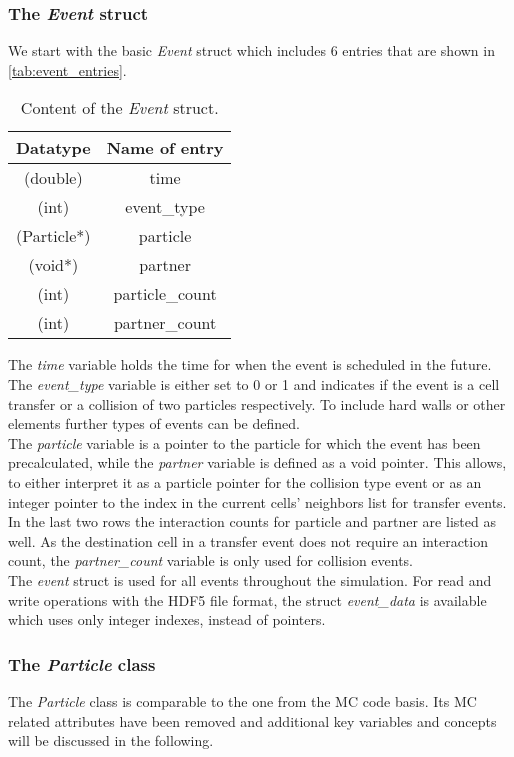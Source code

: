 \subsubsection{The \textit{Event} struct}
\label{sec:event_struct}
We start with the basic \textit{Event} struct which includes 6 entries that are shown in \autoref{tab:event_entries}.
\begin{table}[h!]
\centering
\begin{tabular}{c|c}
\textbf{Datatype} & \textbf{Name of entry}\\ \hline
(double) & time \\
(int) & event\_type \\
(Particle*)  & particle \\
(void*) & partner \\
(int) & particle\_count \\
(int) & partner\_count \\
\end{tabular}
\caption[Event struct content]{Content of the \textit{Event} struct.}
\label{tab:event_entries}
\end{table}
The \textit{time} variable holds the time for when the event is scheduled in the future. The \textit{event\_type} variable is either set to 0 or 1 and indicates if the event is a cell transfer or a collision of two particles respectively. To include hard walls or other elements further types of events can be defined.\\
The \textit{particle} variable is a pointer to the particle for which the event has been precalculated, while the \textit{partner} variable is defined as a void pointer. This allows, to either interpret it as a particle pointer for the collision type event or as an integer pointer to the index in the current cells' neighbors list for transfer events.\\
In the last two rows the interaction counts for particle and partner are listed as well. As the destination cell in a transfer event does not require an interaction count, the \textit{partner\_count} variable is only used for collision events.\\

The \textit{event} struct is used for all events throughout the simulation. For read and write operations with the HDF5 file format, the struct \textit{event\_data} is available which uses only integer indexes, instead of pointers.

\subsubsection{The \textit{Particle} class}
\label{sec:particle_class}
The \textit{Particle} class is comparable to the one from the MC code basis. Its MC related attributes have been removed and additional key variables and concepts will be discussed in the following.\\

